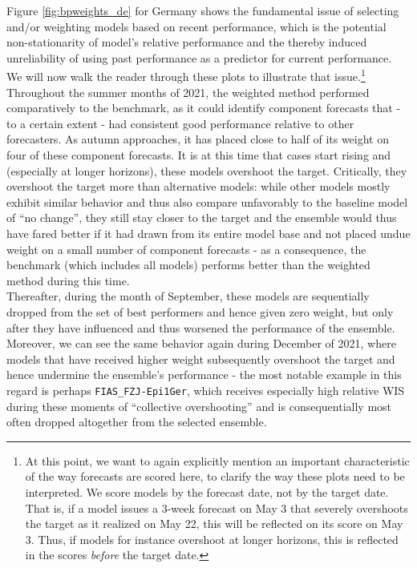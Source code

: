 Figure \ref{fig:bpweights_de} for Germany shows the fundamental issue of selecting and/or weighting models based on recent performance, which is the potential non-stationarity of model's relative performance and the thereby induced unreliability of using past performance as a predictor for current performance. We will now walk the reader through these plots to illustrate that issue.\footnote{At this point, we want to again explicitly mention an important characteristic of the way forecasts are scored here, to clarify the way these plots need to be interpreted. We score models by the forecast date, not by the target date. That is, if a model issues a 3-week forecast on May 3 that severely overshoots the target as it realized on May 22, this will be reflected on its score on May 3. Thus, if models for instance overshoot at longer horizons, this is reflected in the scores \textit{before} the target date.} Throughout the summer months of 2021, the weighted method performed comparatively to the benchmark, as it could identify component forecasts that - to a certain extent - had consistent good performance relative to other forecasters. As autumn approaches, it has placed close to half of its weight on four of these component forecasts. It is at this time that cases start rising and (especially at longer horizons), these models overshoot the target. Critically, they overshoot the target more than alternative models: while other models mostly exhibit similar behavior and thus also compare unfavorably to the baseline model of ``no change'', they still stay closer to the target and the ensemble would thus have fared better if it had drawn from its entire model base and not placed undue weight on a small number of component forecasts - as a consequence, the benchmark (which includes all models) performs better than the weighted method during this time.\\ 
Thereafter, during the month of September, these models are sequentially dropped from the set of best performers and hence given zero weight, but only after they have influenced and thus worsened the performance of the ensemble. Moreover, we can see the same behavior again during December of 2021, where models that have received higher weight subsequently overshoot the target and hence undermine the ensemble's performance - the most notable example in this regard is perhaps \texttt{FIAS\_FZJ-Epi1Ger}, which receives especially high relative WIS during these moments of ``collective overshooting'' and is consequentially most often dropped altogether from the selected ensemble.\\ 
